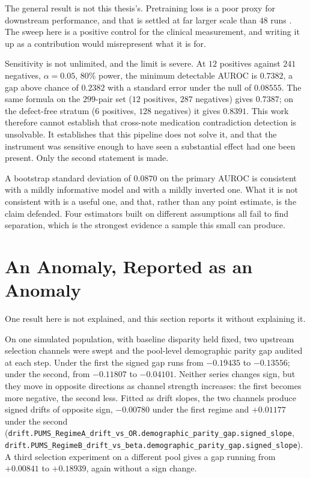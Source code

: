 The general result is not this thesis's. Pretraining loss is a poor proxy for
downstream performance, and that is settled at far larger scale than $48$ runs
\citep{lourie2025scaling,feng2026tessera}. The
sweep here is a positive control for the clinical measurement, and writing it up
as a contribution would misrepresent what it is for.

Sensitivity is not unlimited, and the limit is severe. At $12$ positives against
$241$ negatives, $\alpha = 0.05$, $80\%$ power, the minimum detectable AUROC is
$0.7382$, a gap above chance of $0.2382$ with a standard error under the null of
$0.08555$. The same formula on the $299$-pair set ($12$ positives, $287$
negatives) gives $0.7387$; on the defect-free stratum ($6$ positives, $128$
negatives) it gives $0.8391$. This work therefore cannot establish that cross-note
medication contradiction detection is unsolvable. It establishes that this
pipeline does not solve it, and that the instrument was sensitive enough to have
seen a substantial effect had one been present. Only the second statement is
made.

A bootstrap standard deviation of $0.0870$ on the primary AUROC is consistent
with a mildly informative model and with a mildly inverted one. What it is not
consistent with is a useful one, and that, rather than any point estimate, is the
claim defended. Four estimators built on different assumptions all fail to find
separation, which is the strongest evidence a sample this small can produce.

\section{An Anomaly, Reported as an Anomaly}
\label{sec:disc-anomaly}

One result here is not explained, and this section reports it without explaining
it.

On one simulated population, with baseline disparity held fixed, two upstream
selection channels were swept and the pool-level demographic parity gap audited
at each step. Under the first the signed gap runs from $-0.19435$ to $-0.13556$;
under the second, from $-0.11807$ to $-0.04101$. Neither series changes sign, but
they move in opposite directions as channel strength increases: the first becomes
more negative, the second less. Fitted as drift slopes, the two channels produce
signed drifts of opposite sign, $-0.00780$ under the first regime and
$+0.01177$ under the second
(\texttt{drift.PUMS\_RegimeA\_drift\_vs\_OR.demographic\_parity\_gap.signed\_slope},
\texttt{drift.PUMS\_RegimeB\_drift\_vs\_beta.demographic\_parity\_gap.signed\_slope}).
A third selection experiment on a different pool gives a
gap running from $+0.00841$ to $+0.18939$, again without a sign change.

